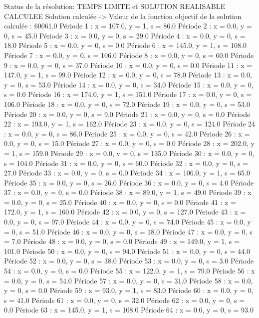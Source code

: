 Status de la résolution: TEMPS LIMITE et SOLUTION REALISABLE CALCULEE
Solution calculée
-> Valeur de la fonction objectif de la solution calculée :  60061.0
Période 1 : x = 107.0, y = 1, s = 86.0
Période 2 : x = 0.0, y = 0, s = 45.0
Période 3 : x = 0.0, y = 0, s = 29.0
Période 4 : x = 0.0, y = 0, s = 18.0
Période 5 : x = 0.0, y = 0, s = 0.0
Période 6 : x = 145.0, y = 1, s = 108.0
Période 7 : x = 0.0, y = 0, s = 106.0
Période 8 : x = 0.0, y = 0, s = 60.0
Période 9 : x = 0.0, y = 0, s = 37.0
Période 10 : x = 0.0, y = 0, s = 0.0
Période 11 : x = 147.0, y = 1, s = 99.0
Période 12 : x = 0.0, y = 0, s = 78.0
Période 13 : x = 0.0, y = 0, s = 53.0
Période 14 : x = 0.0, y = 0, s = 34.0
Période 15 : x = 0.0, y = 0, s = 0.0
Période 16 : x = 174.0, y = 1, s = 151.0
Période 17 : x = 0.0, y = 0, s = 106.0
Période 18 : x = 0.0, y = 0, s = 72.0
Période 19 : x = 0.0, y = 0, s = 53.0
Période 20 : x = 0.0, y = 0, s = 9.0
Période 21 : x = 0.0, y = 0, s = 0.0
Période 22 : x = 193.0, y = 1, s = 162.0
Période 23 : x = 0.0, y = 0, s = 124.0
Période 24 : x = 0.0, y = 0, s = 86.0
Période 25 : x = 0.0, y = 0, s = 42.0
Période 26 : x = 0.0, y = 0, s = 15.0
Période 27 : x = 0.0, y = 0, s = 0.0
Période 28 : x = 202.0, y = 1, s = 159.0
Période 29 : x = 0.0, y = 0, s = 135.0
Période 30 : x = 0.0, y = 0, s = 104.0
Période 31 : x = 0.0, y = 0, s = 60.0
Période 32 : x = 0.0, y = 0, s = 27.0
Période 33 : x = 0.0, y = 0, s = 0.0
Période 34 : x = 106.0, y = 1, s = 65.0
Période 35 : x = 0.0, y = 0, s = 26.0
Période 36 : x = 0.0, y = 0, s = 4.0
Période 37 : x = 0.0, y = 0, s = 0.0
Période 38 : x = 89.0, y = 1, s = 49.0
Période 39 : x = 0.0, y = 0, s = 25.0
Période 40 : x = 0.0, y = 0, s = 0.0
Période 41 : x = 172.0, y = 1, s = 160.0
Période 42 : x = 0.0, y = 0, s = 127.0
Période 43 : x = 0.0, y = 0, s = 97.0
Période 44 : x = 0.0, y = 0, s = 74.0
Période 45 : x = 0.0, y = 0, s = 51.0
Période 46 : x = 0.0, y = 0, s = 18.0
Période 47 : x = 0.0, y = 0, s = 7.0
Période 48 : x = 0.0, y = 0, s = 0.0
Période 49 : x = 149.0, y = 1, s = 101.0
Période 50 : x = 0.0, y = 0, s = 94.0
Période 51 : x = 0.0, y = 0, s = 44.0
Période 52 : x = 0.0, y = 0, s = 38.0
Période 53 : x = 0.0, y = 0, s = 3.0
Période 54 : x = 0.0, y = 0, s = 0.0
Période 55 : x = 122.0, y = 1, s = 79.0
Période 56 : x = 0.0, y = 0, s = 54.0
Période 57 : x = 0.0, y = 0, s = 31.0
Période 58 : x = 0.0, y = 0, s = 0.0
Période 59 : x = 93.0, y = 1, s = 83.0
Période 60 : x = 0.0, y = 0, s = 41.0
Période 61 : x = 0.0, y = 0, s = 32.0
Période 62 : x = 0.0, y = 0, s = 0.0
Période 63 : x = 145.0, y = 1, s = 108.0
Période 64 : x = 0.0, y = 0, s = 93.0
